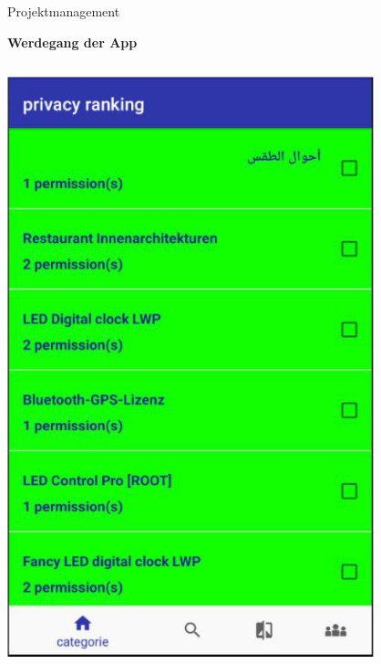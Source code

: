 \documentclass[compress,t]{beamer}
\begin{document}
\begin{frame}{Projektmanagement}

    \textbf{Werdegang der App}

    \begin{columns}[t]
        \centering
        \includegraphics[width=0.8\textwidth]{img/3.jpg}\\
        \centering

\end{columns}
\end{frame}
\end{document}
